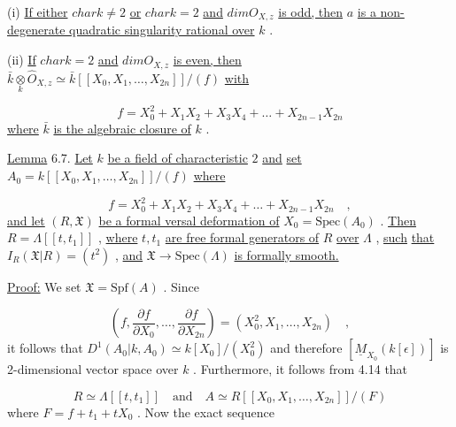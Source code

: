 (i)  \underline{If either}  $char k \neq 2$  \underline{or}  $char k = 2$  \underline{and}  $dim O_{X,z}$  \underline{is odd, then} $a$  \underline{is a non-degenerate quadratic singularity rational over}  $k$  .

(ii)  \underline{If}  $char k = 2$  \underline{and}  $dim O_{X,z}$  \underline{is even, then} $\bar{k} \underset{k}{\otimes} \hat{O}_{X,z} \simeq \bar{k}[[X_0, X_1, \ldots, X_{2n}]]/(f)$  \underline{with}

\begin{equation*}
f = X_0^2 + X_1X_2 + X_3X_4 + \ldots + X_{2n-1}X_{2n}
\end{equation*}
\underline{where}  $\bar{k}$  \underline{is the algebraic closure of}  $k$  .

\underline{Lemma} 6.7.  \underline{Let}  $k$  \underline{be a field of characteristic}  $2$  \underline{and}  \underline{set} $A_0 = k[[X_0, X_1, \ldots ,X_{2n}]]/(f)$  \underline{where}

\begin{equation*}
f = X_0^2 + X_1X_2 + X_3X_4 + \ldots + X_{2n-1}X_{2n} \quad ,
\end{equation*}
\underline{and let}  $(R, \mathfrak{X})$  \underline{be a formal versal deformation of}  $X_0 = \mathrm{Spec}(A_0)$  . \underline{Then} $R = \Lambda[[t, t_1]]$  , \underline{where}  $t, t_1$  \underline{are free formal generators of}  $R$  \underline{over}  $\Lambda$  , \underline{such} \underline{that}  $I_R(\mathfrak{X}|R) = (t^2)$  , \underline{and}  $\mathfrak{X} \to \mathrm{Spec}(\Lambda)$  \underline{is formally smooth.}

\underline{Proof:}  We set  $\mathfrak{X} = \mathrm{Spf}(A)$  . Since

\begin{equation*}
(f, \frac{\partial f}{\partial X_0} , \ldots , \frac{\partial f}{\partial X_{2n}} ) = (X_0^2, X_1, \ldots , X_{2n}) \quad ,
\end{equation*}
it follows that  $D^1(A_0|k, A_0) \simeq  k[X_0]/(X_0^2)$  and therefore  $[\underline{M}_{X_0}(k[\epsilon])]$  is 2-dimensional vector space over  $k$  . Furthermore, it follows from 4.14 that

\begin{equation*}
R \simeq \Lambda[[t, t_1]] \quad \text{and} \quad A \simeq R[[X_0, X_1, \ldots ,X_{2n}]]/(F)
\end{equation*}
where  $F = f + t_1 + tX_0$  . Now the exact sequence

